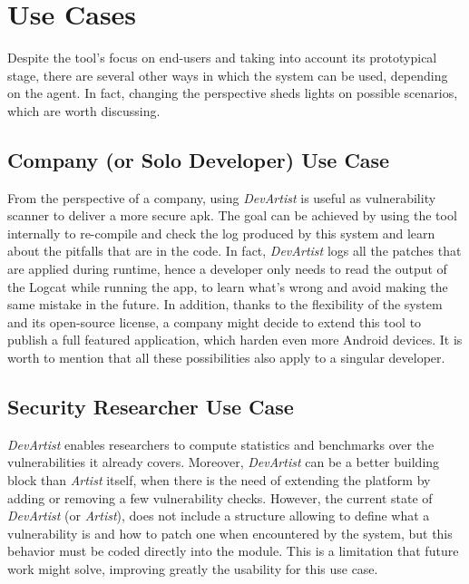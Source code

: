 \section{Use Cases}
Despite the tool's focus on end-users and taking into account its prototypical stage, there are several other ways in which the system can be used, depending on the agent. In fact, changing the perspective sheds lights on possible scenarios, which are worth discussing. 

\subsection{Company (or Solo Developer) Use Case}
From the perspective of a company, using \emph{DevArtist} is useful as vulnerability scanner to deliver a more secure apk. The goal can be achieved by using the tool internally to re-compile and check the log produced by this system and learn about the pitfalls that are in the code. In fact, \emph{DevArtist} logs all the patches that are applied during runtime, hence a developer only needs to read the output of the Logcat while running the app, to learn what's wrong and avoid making the same mistake in the future. In addition, thanks to the flexibility of the system and its open-source license, a company might decide to extend this tool to publish a full featured application, which harden even more Android devices. It is worth to mention that all these possibilities also apply to a singular developer.

\subsection{Security Researcher Use Case}
\emph{DevArtist} enables researchers to compute statistics and benchmarks over the vulnerabilities it already covers. Moreover, \emph{DevArtist} can be a better building block than \emph{Artist} itself, when there is the need of extending the platform by adding or removing a few vulnerability checks. However, the current state of \emph{DevArtist} (or \emph{Artist}), does not include a structure allowing to define what a vulnerability is and how to patch one when encountered by the system, but this behavior must be coded directly into the module. This is a limitation that future work might solve, improving greatly the usability for this use case.

